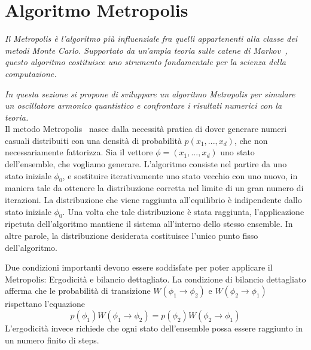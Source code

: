 \chapter{\huge Algoritmo Metropolis}

\textit{Il Metropolis è l'algoritmo più influenziale fra quelli appartenenti alla classe dei metodi Monte Carlo. Supportato da un'ampia teoria sulle catene di Markov~\cite{due}, questo algoritmo costituisce uno strumento fondamentale per la scienza della computazione.}

\textit{In questa sezione si propone di sviluppare un algoritmo Metropolis per simulare un oscillatore armonico quantistico e confrontare i risultati numerici con la teoria.}
\\

Il metodo Metropolis~\cite{quattro} nasce dalla necessità pratica di dover generare numeri casuali distribuiti con una densità di probabilità $p(x_1,...,x_d)$, che non necessariamente fattorizza. Sia il vettore $\phi = (x_1,...,x_d)$ uno stato dell'ensemble, che vogliamo generare. L'algoritmo consiste nel partire da uno stato iniziale $\phi_0$, e sostituire iterativamente uno stato vecchio con uno nuovo, in maniera tale da ottenere la distribuzione corretta nel limite di un gran numero di iterazioni. La distribuzione che viene raggiunta all'equilibrio è indipendente dallo stato iniziale $\phi_0$. Una volta che tale distribuzione è stata raggiunta, l'applicazione ripetuta dell'algoritmo mantiene il sistema all'interno dello stesso ensemble. In altre parole, la distribuzione desiderata costituisce l'unico punto fisso dell'algoritmo.

Due condizioni importanti devono essere soddisfate per poter applicare il Metropolis: Ergodicità e bilancio dettagliato. La condizione di bilancio dettagliato afferma che le probabilità di transizione $W(\phi_1\rightarrow\phi_2)$ e $W(\phi_2\rightarrow\phi_1)$ rispettano l'equazione $$p(\phi_1)W(\phi_1\rightarrow\phi_2) = p(\phi_2)W(\phi_2\rightarrow\phi_1)$$
L'ergodicità invece richiede che ogni stato dell'ensemble possa essere raggiunto in un numero finito di steps.

